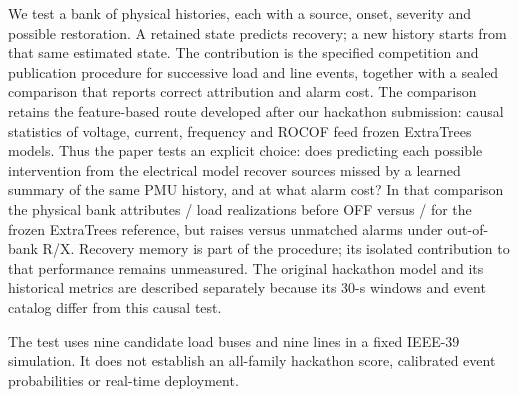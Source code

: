 We test a bank of physical histories, each with a source, onset, severity
and possible restoration. A retained state predicts recovery; a new history
starts from that same estimated state. The contribution is the specified
competition and publication procedure for successive load and line events,
together with a sealed comparison that reports correct attribution and alarm
cost. The comparison retains the feature-based route developed after our
hackathon submission: causal statistics of voltage, current, frequency and
ROCOF feed frozen ExtraTrees models. Thus the paper tests an explicit choice:
does predicting each possible intervention from the electrical model recover
sources missed by a learned summary of the same PMU history, and at what
alarm cost? In that comparison the physical bank attributes
\ReaderPhysicalLoad{}/\ReaderFamilyTotal{} load realizations before OFF
versus \ReaderETLoad{}/\ReaderFamilyTotal{} for the frozen ExtraTrees
reference, but raises \ReaderPhysicalOutsideExtras{} versus
\ReaderETOutsideExtras{} unmatched alarms under out-of-bank R/X. Recovery
memory is part of the procedure; its isolated contribution to that
performance remains unmeasured. The original hackathon model and its
historical metrics are described separately because its 30-s windows and
event catalog differ from this causal test.

The test uses nine candidate load buses and nine lines in a fixed IEEE-39
simulation. It does not establish an all-family hackathon score, calibrated
event probabilities or real-time deployment.
